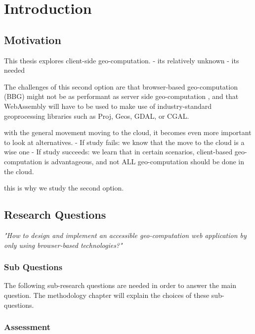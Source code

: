 \chapter{Introduction}

\section{Motivation}
This thesis explores client-side geo-computation. 
- its relatively unknown 
- its needed  

The challenges of this second option are that browser-based geo-computation (BBG) might not be as performant as server side geo-computation \cite{panidi_hybrid_2015, hamilton_client-side_2014}, and that WebAssembly will have to be used to make use of industry-standard geoprocessing libraries such as Proj, Geos, GDAL, or CGAL.

with the general movement moving to the cloud, it becomes even more important to look at alternatives. 
- If study fails: we know that the move to the cloud is a wise one
- If study succeeds: we learn that in certain scenarios, client-based geo-computation is advantageous, and not ALL geo-computation should be done in the cloud.

this is why we study the second option. 

\newpage
\section{Research Questions}

\textit{"How to design and implement an accessible geo-computation web application by only using browser-based technologies?"}

\subsection*{Sub Questions}

The following sub-research questions are needed in order to answer the main question. The methodology chapter will explain the choices of these sub-questions. 

\newpage
\subsection*{Assessment}

